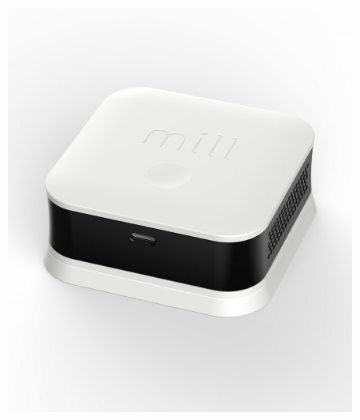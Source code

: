 \begin{figure} [H]
    \centering
    \begin{subfigure}{0.3\textwidth}
         \centering
         \includegraphics[width=1\textwidth]{figures/MillSense.jpg}
         \label{fig:MillSenseDev}
     \end{subfigure}
     \hspace{2cm}
    \begin{subfigure}{0.3\textwidth}
         \centering

\end{subfigure}
\end{figure}
